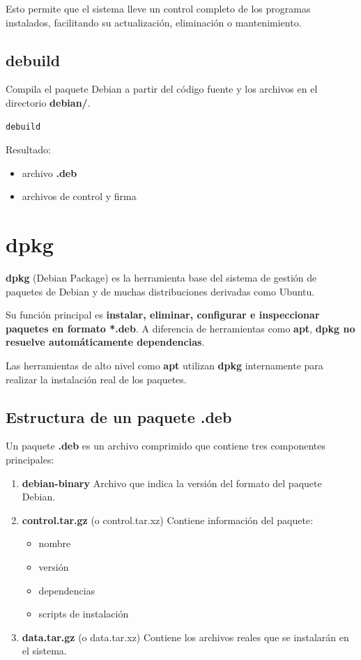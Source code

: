 \documentclass[11pt, letterpaper]{article}
\begin{document}
Esto permite que el sistema lleve un control completo de los programas instalados, facilitando su actualización, eliminación o mantenimiento.
\subsection{debuild}
\label{sec:org355bf25}

Compila el paquete Debian a partir del código fuente y los archivos en el directorio \textbf{debian/}.

\begin{verbatim}
debuild
\end{verbatim}

Resultado:

\begin{itemize}
\item archivo \textbf{.deb}
\item archivos de control y firma
\end{itemize}
\section{dpkg}
\label{sec:orgbd11714}

\textbf{dpkg} (Debian Package) es la herramienta base del sistema de gestión de paquetes
de Debian y de muchas distribuciones derivadas como Ubuntu.

Su función principal es \textbf{instalar, eliminar, configurar e inspeccionar paquetes
en formato *.deb}. A diferencia de herramientas como \textbf{apt}, \textbf{dpkg no resuelve
automáticamente dependencias}.

Las herramientas de alto nivel como \textbf{apt} utilizan \textbf{dpkg} internamente para
realizar la instalación real de los paquetes.
\subsection{Estructura de un paquete .deb}
\label{sec:org9d96cc6}

Un paquete \textbf{.deb} es un archivo comprimido que contiene tres componentes principales:

\begin{enumerate}
\item \textbf{debian-binary}  
Archivo que indica la versión del formato del paquete Debian.

\item \textbf{control.tar.gz} (o control.tar.xz)  
Contiene información del paquete:
\begin{itemize}
\item nombre
\item versión
\item dependencias
\item scripts de instalación
\end{itemize}

\item \textbf{data.tar.gz} (o data.tar.xz)  
Contiene los archivos reales que se instalarán en el sistema.
\end{enumerate}
\end{document}
